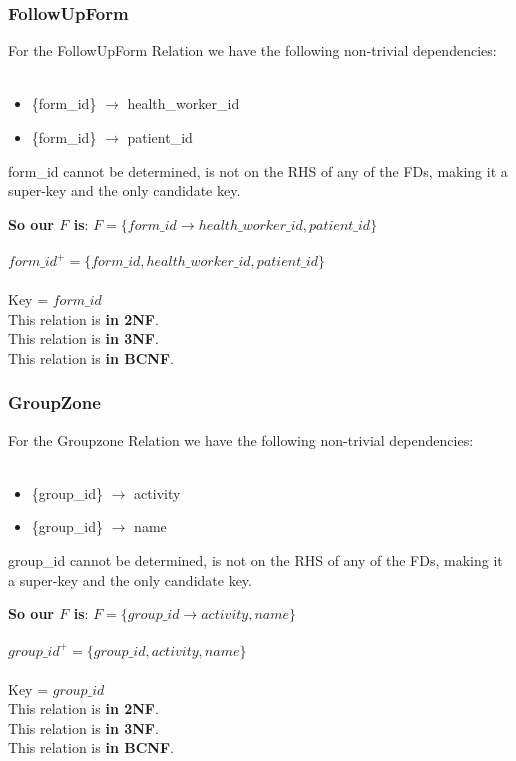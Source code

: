 \subsubsection{FollowUpForm}
For the FollowUpForm Relation we have the following non-trivial dependencies:\\
\\
\begin{minipage}{\textwidth}
\begin{itemize}
    \item  \{form\_id\}   $\rightarrow$ health\_worker\_id
    \item  \{form\_id\}   $\rightarrow$ patient\_id
\end{itemize}
\end{minipage}
form\_id cannot be determined, is not on the RHS of any of the FDs, making it a super-key and the only candidate key.
\begin{tcolorbox}
    \textbf{So our $F$ is}:
$F = \{form\_id \rightarrow health\_worker\_id, patient\_id\}$\\
\\
$form\_id^+ = \{form\_id, health\_worker\_id, patient\_id\}$\\
\\
Key = $form\_id$\\
This relation is \textbf{in 2NF}.\\
This relation is \textbf{in 3NF}.\\
This relation is \textbf{in BCNF}.
\end{tcolorbox}
\newpage
\subsubsection{GroupZone}
For the Groupzone Relation we have the following non-trivial dependencies:\\
\\
\begin{minipage}{\textwidth}
\begin{itemize}
    \item  \{group\_id\}   $\rightarrow$ activity
    \item  \{group\_id\}   $\rightarrow$ name
\end{itemize}
\end{minipage}
group\_id cannot be determined, is not on the RHS of any of the FDs, making it a super-key and the only candidate key.
\begin{tcolorbox}
    \textbf{So our $F$ is}:
$F = \{group\_id \rightarrow activity, name \}$\\
\\
$group\_id^+ = \{group\_id, activity, name\}$\\
\\
Key = $group\_id$\\
This relation is \textbf{in 2NF}.\\
This relation is \textbf{in 3NF}.\\
This relation is \textbf{in BCNF}.
\end{tcolorbox}
